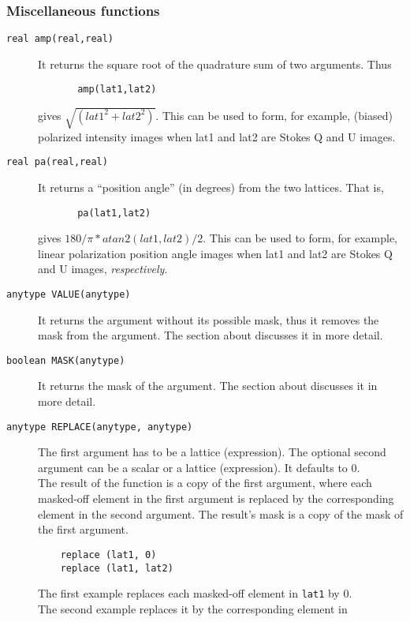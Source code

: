 \subsubsection{Miscellaneous functions}
\begin{description}
  \item[ \texttt{real amp(real,real)}]
    It returns the square root of the quadrature sum of two
    arguments.  Thus
    \begin{verbatim}
       amp(lat1,lat2)
    \end{verbatim}
    gives $\sqrt{(lat1^2+lat2^2)}$.  This can be used to form, for
    example, (biased) polarized intensity images when lat1 and lat2
    are Stokes Q and U images.
  \item[ \texttt{real pa(real,real)}]
    It returns a ``position angle'' (in degrees) from the two lattices.  That is,
    \begin{verbatim}
       pa(lat1,lat2)
    \end{verbatim}
    gives $180/\pi*atan2(lat1,lat2)/2$.  This can be used to form, for
    example, linear polarization position angle images when
    lat1 and lat2  are Stokes Q and U images, {\it respectively}.
  \item[ \texttt{anytype VALUE(anytype)}]
    It returns the argument without its possible mask, thus it removes
    the mask from the argument.
    The section about 
    discusses it in more detail.
  \item[ \texttt{boolean MASK(anytype)}]
    It returns the mask of the argument.
    The section about 
    discusses it in more detail.
  \item[ \texttt{anytype REPLACE(anytype, anytype)}]
    The first argument has to be a lattice (expression).
    The optional second argument can be a scalar or a lattice
    (expression). It defaults to 0.
    \\The result of the function is a copy of the first argument,
    where each masked-off element in the first argument is replaced by the
    corresponding element in the second argument. The result's mask is
    a copy of the mask of the first argument.
    \begin{verbatim}
    replace (lat1, 0)
    replace (lat1, lat2)
    \end{verbatim}
    The first example replaces each masked-off element in
    \texttt{lat1} by 0.
    \\The second example replaces it by the corresponding element in

\end{description}
